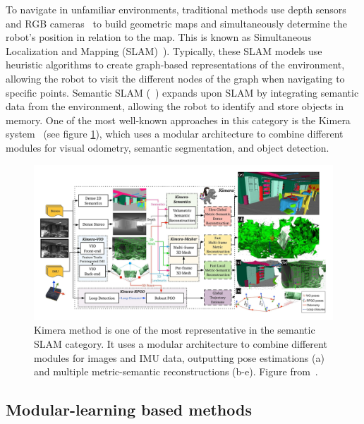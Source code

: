 To navigate in unfamiliar environments, traditional methods use depth sensors~\cite{newcombe2011, thrun2001} and RGB cameras~\cite{jones2011, sattler2018} to build geometric maps and simultaneously determine the robot's position in relation to the map.
This is known as Simultaneous Localization and Mapping (SLAM)~\cite{Kazerouni2022, campos2021, labbe2022}).
Typically, these SLAM models use heuristic algorithms to create graph-based representations of the environment, allowing the robot to visit the different nodes of the graph when navigating to specific points.
Semantic SLAM (\eg~\cite{zhang2018, jin2023}) expands upon SLAM by integrating semantic data from the environment, allowing the robot to identify and store objects in memory.
One of the most well-known approaches in this category is the Kimera system~\cite{rosinol2020} (see figure \ref{fig:kimera-chart}), which uses a modular architecture to combine different modules for visual odometry, semantic segmentation, and object detection.

\begin{figure}
    \centering
    \includegraphics[width=\textwidth]{figures/related_work/kimera_chart_25 Large}
    \caption{Kimera method is one of the most representative in the semantic SLAM category.
    It uses a modular architecture to combine different modules for images and IMU data, outputting pose estimations (a) and multiple metric-semantic reconstructions (b-e).
    Figure from~\cite{rosinol2020}.}
    \label{fig:kimera-chart}
\end{figure}

\subsection{Modular-learning based methods}\label{subsec:modular-learning-based-methods}

